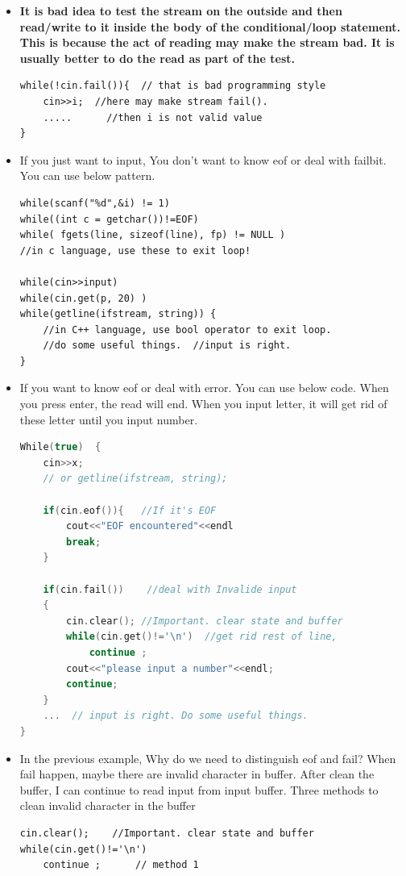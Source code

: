 \documentclass[a4paper,11pt,twoside]{book}
\begin{document}
\begin{itemize}
	\item \textbf{It is bad idea to test the stream on the outside and then read/write to it inside the body of the conditional/loop statement. This is because the act of reading may make the stream bad. It is usually better to do the read as part of the test.}
	
\begin{lstlisting}[numbers=none]
while(!cin.fail()){  // that is bad programming style
	cin>>i;  //here may make stream fail().
	.....      //then i is not valid value
}
\end{lstlisting}
	
	\item If you just want to input, You don't want to know eof or deal with failbit. You can use below pattern.
	
\begin{lstlisting}[numbers=none]
while(scanf("%d",&i) != 1)
while((int c = getchar())!=EOF)
while( fgets(line, sizeof(line), fp) != NULL )
//in c language, use these to exit loop!
	
while(cin>>input)
while(cin.get(p, 20) )
while(getline(ifstream, string)) {
	//in C++ language, use bool operator to exit loop.
	//do some useful things.  //input is right.
}
\end{lstlisting}
	
	\item If you want to know eof or deal with error. You can use below code. When you press enter, the read will end. When you input letter, it will get rid of these letter until you input number. 
\begin{lstlisting}[frame=single, language=c++]
While(true)  {
    cin>>x;
    // or getline(ifstream, string);

	if(cin.eof()){   //If it's EOF
		cout<<"EOF encountered"<<endl
		break;
	}
	
	if(cin.fail())    //deal with Invalide input
	{
		cin.clear(); //Important. clear state and buffer
		while(cin.get()!='\n')  //get rid rest of line,
			continue ;
		cout<<"please input a number"<<endl;
		continue;
	}
	...  // input is right. Do some useful things.
}
\end{lstlisting}
	
	\item In the previous example, Why do we need to distinguish eof and fail? When fail happen, maybe there are invalid character in buffer. After clean the buffer, I can continue to read input from input buffer. Three methods to clean invalid character in the buffer
\begin{lstlisting}[numbers=none]
cin.clear();    //Important. clear state and buffer
while(cin.get()!='\n')
	continue ;      // method 1
	

\end{lstlisting}
\end{itemize}
\end{document}
